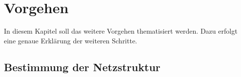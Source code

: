 \chapter{Vorgehen} \label{chap:Vorgehen}
In diesem Kapitel soll das weitere Vorgehen thematisiert werden. Dazu erfolgt eine genaue Erklärung der weiteren Schritte.

\section{Bestimmung der Netzstruktur}
